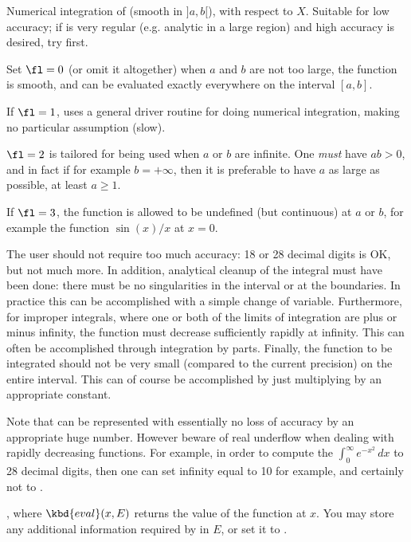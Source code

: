 \label{se:intnumromb}
Numerical integration of  (smooth in $]a,b[$), with respect to
$X$. Suitable for low accuracy; if  is very regular (e.g. analytic
in a large region) and high accuracy is desired, try  first.

Set $\fl=0$ (or omit it altogether) when $a$ and $b$ are not too large, the
function is smooth, and can be evaluated exactly everywhere on the interval
$[a,b]$.

If $\fl=1$, uses a general driver routine for doing numerical integration,
making no particular assumption (slow).

$\fl=2$ is tailored for being used when $a$ or $b$ are infinite. One
\emph{must} have $ab>0$, and in fact if for example $b=+\infty$, then it is
preferable to have $a$ as large as possible, at least $a\ge1$.

If $\fl=3$, the function is allowed to be undefined (but continuous) at $a$
or $b$, for example the function $\sin(x)/x$ at $x=0$.

The user should not require too much accuracy: 18 or 28 decimal digits is OK,
but not much more. In addition, analytical cleanup of the integral must have
been done: there must be no singularities in the interval or at the
boundaries. In practice this can be accomplished with a simple change of
variable. Furthermore, for improper integrals, where one or both of the
limits of integration are plus or minus infinity, the function must decrease
sufficiently rapidly at infinity. This can often be accomplished through
integration by parts. Finally, the function to be integrated should not be
very small (compared to the current precision) on the entire interval. This
can of course be accomplished by just multiplying by an appropriate constant.

Note that  can be represented with essentially no loss of
accuracy by an appropriate huge number. However beware of real underflow
when dealing with rapidly decreasing functions. For example, in order to
compute the $\int_0^\infty e^{-x^2}\,dx$ to 28 decimal digits, then one can
set infinity equal to 10 for example, and certainly not to .

,
where $\kbd{eval}(x, E)$ returns the value of the function at $x$.
You may store any additional information required by  in $E$, or set
it to .

